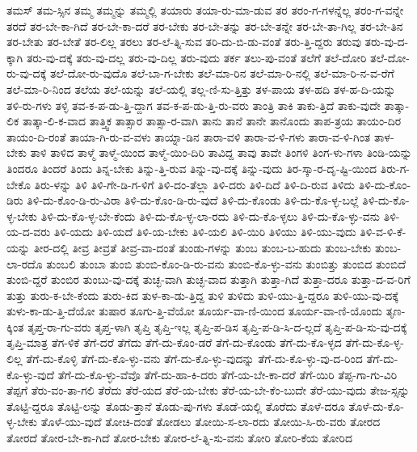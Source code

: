 {ತಮಸ್
ತಮ-ಸ್ಸಿನ
ತಮ್ಮ
ತಮ್ಮನ್ನು
ತಮ್ಮಲ್ಲಿ
ತಯಾರು
ತಯಾ-ರು-ಮಾ-ಡುವ
ತರ
ತರಂ-ಗ-ಗಳನ್ನೆಲ್ಲ
ತರಂ-ಗ-ವನ್ನೇ
ತರದೆ
ತರ-ಬೇ-ಕಾ-ಗಿದೆ
ತರ-ಬೇ-ಕಾ-ದರೆ
ತರ-ಬೇಕು
ತರ-ಬೇ-ತನ್ನು
ತರ-ಬೇ-ತನ್ನೇ
ತರ-ಬೇ-ತಾ-ಗಿಲ್ಲ
ತರ-ಬೇ-ತಿನ
ತರ-ಬೇತು
ತರ-ಬೇತೆ
ತರ-ಲಿಲ್ಲ
ತರಲು
ತರ-ಲೆ-ತ್ನಿ-ಸುವ
ತರಿ-ದು-ಬಿ-ಡು-ವಂತೆ
ತರು-ತ್ತಿ-ದ್ದರು
ತರುವು
ತರು-ವು-ದ-ಕ್ಕಾಗಿ
ತರು-ವು-ದಕ್ಕೆ
ತರು-ವು-ದಲ್ಲ
ತರು-ವು-ದಿಲ್ಲ
ತರು-ವುದು
ತರ್ಕ
ತಲು-ಪು-ವಂತೆ
ತಲೆಗೆ
ತಲೆ-ದೋರಿ
ತಲೆ-ದೋ-ರು-ವು-ದಕ್ಕೆ
ತಲೆ-ದೋ-ರು-ವುದೊ
ತಲೆ-ಬಾ-ಗ-ಬೇಕು
ತಲೆ-ಮಾ-ರಿನ
ತಲೆ-ಮಾ-ರಿ-ನಲ್ಲಿ
ತಲೆ-ಮಾ-ರಿ-ನ-ವ-ರೆಗೆ
ತಲೆ-ಮಾ-ರಿ-ನಿಂದ
ತಲೆಯ
ತಲೆ-ಯನ್ನು
ತಲೆ-ಯಲ್ಲಿ
ತಲ್ಲ-ಣಿ-ಸು-ತ್ತಿತ್ತು
ತಳ-ಪಾಯ
ತಳ-ಹದಿ
ತಳ-ಹ-ದಿ-ಯನ್ನು
ತಳಿ-ರು-ಗಳು
ತಳ್ಳಿ
ತವ-ಕ-ಪ-ಡು-ತ್ತಿ-ದ್ದಾಗ
ತವ-ಕ-ಪ-ಡು-ತ್ತಿ-ರು-ವರು
ತಾಂತ್ರಿ
ತಾಕಿ
ತಾಕು-ತ್ತಿದೆ
ತಾಕು-ವುದೇ
ತಾತ್ಕಾ-ಲಿಕ
ತಾತ್ಕಾ-ಲಿ-ಕ-ವಾದ
ತಾತ್ತ್ವಿಕ
ತಾತ್ಸಾರ
ತಾತ್ಸಾ-ರ-ವಾಗಿ
ತಾನು
ತಾನೆ
ತಾನೇ
ತಾನೊಂದು
ತಾಪ-ತ್ರಯ
ತಾಯಂ-ದಿರ
ತಾಯಂ-ದಿ-ರಂತೆ
ತಾಯಾ-ಗಿ-ರು-ವ-ವಳು
ತಾಯ್ನಾ-ಡಿನ
ತಾರಾ-ವಳಿ
ತಾರಾ-ವ-ಳಿ-ಗಳು
ತಾರಾ-ವ-ಳಿ-ಗಿಂತ
ತಾಳ-ಬೇಕು
ತಾಳಿ
ತಾಳಿದ
ತಾಳ್ಮೆ
ತಾಳ್ಮೆ-ಯಿಂದ
ತಾಳ್ಮೆ-ಯಿಂ-ದಿರಿ
ತಾವಿದ್ದ
ತಾವು
ತಾವೇ
ತಿಂಗಳಿ
ತಿಂಗ-ಳು-ಗಳಾ
ತಿಂಡಿ-ಯನ್ನು
ತಿಂದರೂ
ತಿಂದರೆ
ತಿಂದು
ತಿನ್ನ-ಬೇಕು
ತಿನ್ನು-ತ್ತಿ-ರುವ
ತಿನ್ನು-ವು-ದಕ್ಕೆ
ತಿನ್ನು-ವುದು
ತಿರ-ಸ್ಕಾ-ರ-ದೃ-ಷ್ಟಿ-ಯಿಂದ
ತಿರು-ಗ-ಬೇಕೊ
ತಿರು-ಳನ್ನು
ತಿಳಿ
ತಿಳಿ-ಗೇ-ಡಿ-ಗ-ಳಿಗೆ
ತಿಳಿ-ದಂ-ತೆಲ್ಲಾ
ತಿಳಿ-ದರು
ತಿಳಿ-ದಿದೆ
ತಿಳಿ-ದಿ-ರುವ
ತಿಳಿದು
ತಿಳಿ-ದು-ಕೊಂ-ಡಿರು
ತಿಳಿ-ದು-ಕೊಂ-ಡಿ-ರು-ವಿರಾ
ತಿಳಿ-ದು-ಕೊಂ-ಡಿ-ರು-ವುದೆ
ತಿಳಿ-ದು-ಕೊಂಡು
ತಿಳಿ-ದು-ಕೊ-ಳ್ಳ-ಬಲ್ಲೆ
ತಿಳಿ-ದು-ಕೊ-ಳ್ಳ-ಬೇಕು
ತಿಳಿ-ದು-ಕೊ-ಳ್ಳ-ಬೇ-ಕೆಂದು
ತಿಳಿ-ದು-ಕೊ-ಳ್ಳ-ಲಾ-ರದು
ತಿಳಿ-ದು-ಕೊ-ಳ್ಳಲು
ತಿಳಿ-ದು-ಕೊ-ಳ್ಳು-ವನು
ತಿಳಿ-ಯ-ದ-ವರು
ತಿಳಿ-ಯದು
ತಿಳಿ-ಯದೆ
ತಿಳಿ-ಯ-ಬೇಕು
ತಿಳಿ-ಯಲಿ
ತಿಳಿ-ಯಿರಿ
ತಿಳಿಯು
ತಿಳಿ-ಯು-ವುದು
ತಿಳಿ-ವ-ಳಿ-ಕೆ-ಯನ್ನು
ತೀರ-ದಲ್ಲಿ
ತೀವ್ರ
ತೀವ್ರತೆ
ತೀವ್ರ-ವಾ-ದಂತೆ
ತುಂಡು-ಗಳನ್ನು
ತುಂಬ
ತುಂಬ-ಬ-ಹುದು
ತುಂಬ-ಬೇಕು
ತುಂಬ-ಲಾ-ರದೊ
ತುಂಬಲಿ
ತುಂಬಾ
ತುಂಬಿ
ತುಂಬಿ-ಕೊಂ-ಡಿ-ರು-ವನು
ತುಂಬಿ-ಕೊ-ಳ್ಳು-ವನು
ತುಂಬಿತ್ತು
ತುಂಬಿದ
ತುಂಬಿದೆ
ತುಂಬಿ-ದ್ದರೆ
ತುಂಬಿರ
ತುಂಬು-ವು-ದಕ್ಕೆ
ತುಚ್ಛ-ವಾಗಿ
ತುಚ್ಛ-ವಾದ
ತುತ್ತಾಗಿ
ತುತ್ತಾ-ಗಿದೆ
ತುತ್ತಾ-ದರೂ
ತುತ್ತಾ-ದ-ವ-ರಿಗೆ
ತುತ್ತು
ತುರು-ಕ-ಬೇ-ಕೆಂದು
ತುರು-ಕಿದ
ತುಳ-ಕಾ-ಡು-ತ್ತಿದ್ದ
ತುಳಿ
ತುಳಿದು
ತುಳಿ-ಯು-ತ್ತಿ-ದ್ದರೂ
ತುಳಿ-ಯು-ವು-ದಕ್ಕೆ
ತುಳು-ಕಾ-ಡು-ತ್ತಿ-ದೆಯೋ
ತುಷಾರ
ತೂಗು-ತ್ತಿ-ವೆಯೋ
ತೂರ್ಯ-ವಾ-ಣಿ-ಯಿಂದ
ತೂರ್ಯ-ವಾ-ಣಿ-ಯೊಂದು
ತೃಣ-ಕ್ಕಿಂತ
ತೃಪ್ತ-ರಾ-ಗು-ವರು
ತೃಪ್ತ-ಳಾಗಿ
ತೃಪ್ತಿ
ತೃಪ್ತಿ-ಇಲ್ಲ
ತೃಪ್ತಿ-ಪ-ಡಿಸ
ತೃಪ್ತಿ-ಪ-ಡಿ-ಸಿ-ದ-ಲ್ಲದೆ
ತೃಪ್ತಿ-ಪ-ಡಿ-ಸು-ವು-ದಕ್ಕೆ
ತೃಪ್ತಿ-ಮಾತ್ರ
ತೆಗ-ಳಿಕೆ
ತೆಗೆ-ದರೆ
ತೆಗೆದು
ತೆಗೆ-ದು-ಕೊಂ-ಡರೆ
ತೆಗೆ-ದು-ಕೊಂಡು
ತೆಗೆ-ದು-ಕೊ-ಳ್ಳದ
ತೆಗೆ-ದು-ಕೊ-ಳ್ಳ-ಲಿಲ್ಲ
ತೆಗೆ-ದು-ಕೊಳ್ಳಿ
ತೆಗೆ-ದು-ಕೊ-ಳ್ಳು-ವನು
ತೆಗೆ-ದು-ಕೊ-ಳ್ಳು-ವುದನ್ನು
ತೆಗೆ-ದು-ಕೊ-ಳ್ಳು-ವು-ದ-ರಿಂದ
ತೆಗೆ-ದು-ಕೊ-ಳ್ಳು-ವುದೆ
ತೆಗೆ-ದು-ಕೊ-ಳ್ಳು-ವೆವೊ
ತೆಗೆ-ದು-ಹಾ-ಕಿ-ದರು
ತೆಗೆ-ಯ-ಬೇ-ಕಾ-ದರೆ
ತೆಗೆ-ಯಿರಿ
ತೆಪ್ಪ-ಗಾ-ಗು-ವಿರಿ
ತೆಪ್ಪಗೆ
ತೆರು-ವಂ-ತಾ-ಗಲಿ
ತೆರೆದು
ತೆರೆ-ಯದ
ತೆರೆ-ಯ-ಬೇಕು
ತೆರೆ-ಯ-ಬೇ-ಕೆಂ-ಬುದೇ
ತೆರೆ-ಯು-ವುದು
ತೇಜ-ಸ್ಸನ್ನು
ತೊಟ್ಟಿ-ದ್ದರೂ
ತೊಟ್ಟಿ-ಲನ್ನು
ತೊಡು-ತ್ತಾನೆ
ತೊಡು-ಪು-ಗಳು
ತೊಡೆ-ಯಲ್ಲಿ
ತೊರೆದು
ತೊಳೆ-ದರೂ
ತೊಳೆ-ದು-ಕೊ-ಳ್ಳ-ಬೇಕು
ತೊಳೆ-ಯು-ವುದೆ
ತೋಚಿ-ದಂತೆ
ತೋಡಲು
ತೋಯಿ-ಸ-ಲಾ-ರದು
ತೋಯಿ-ಸಿ-ರು-ವರು
ತೋರದ
ತೋರದೆ
ತೋರ-ಬೇ-ಕಾ-ಗಿದೆ
ತೋರ-ಬೇಕು
ತೋರ-ಲೆ-ತ್ನಿ-ಸು-ವನು
ತೋರಿ
ತೋರಿ-ಕೆಯ
ತೋರಿದ
}
